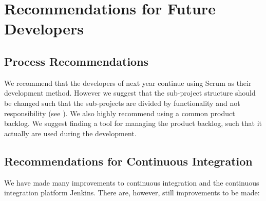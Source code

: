 \chapter{Recommendations for Future Developers}\label{chap:future_dev_recommendations}

\section{Process Recommendations}

We recommend that the developers of next year continue using Scrum as their development method. However we suggest that the sub-project structure should be changed such that the sub-projects are divided by functionality and not responsibility (see ). We also highly recommend using a common product backlog. We suggest finding a tool for managing the product backlog, such that it actually are used during the development.


\section{Recommendations for Continuous Integration}
We have made many improvements to continuous integration and the continuous integration platform Jenkins. There are, however, still improvements to be made: 

